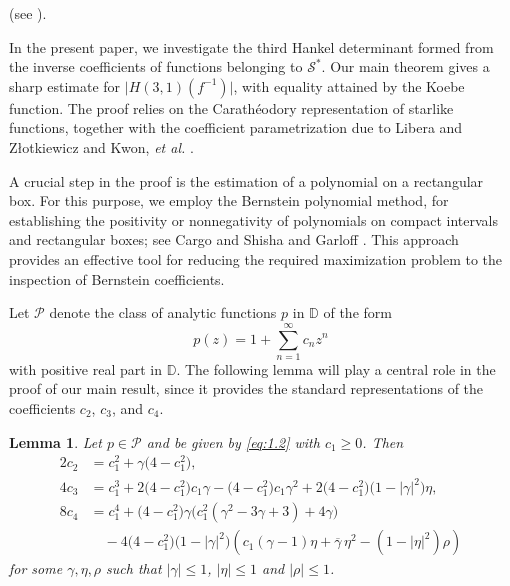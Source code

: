 \documentclass[a4paper,12pt,reqno]{amsart}
\numberwithin{equation}{section}
\newtheorem{lem}[thm]{Lemma}
\begin{document}
(see \cite{KowalczykLeckoSim2018convex,KowalczykLeckoThomas2022}).\\
\par In the present paper, we investigate the third Hankel determinant formed from the inverse coefficients of functions belonging to \(\mathcal{S}^{*}\). Our main theorem gives a sharp estimate for \(\bigl|H(3,1)(f^{-1})\bigr|\), with equality attained by the Koebe function. The proof relies on the Carath\'eodory representation of starlike functions, together with the coefficient parametrization due to Libera and Z{\l}otkiewicz \cite{LiberaZlotkiewicz1982} and Kwon, \textit{et al.} \cite{KwonLeckoSim2018Caratheodory}.\\
\par A crucial step in the proof is the estimation of a polynomial on a rectangular box. For this purpose, we employ the Bernstein polynomial method,  for establishing the positivity or nonnegativity of polynomials on compact intervals and rectangular boxes; see Cargo and Shisha \cite{CargoShisha1966} and Garloff \cite{Garloff1986}. This approach provides an effective tool for reducing the required maximization problem to the inspection of Bernstein coefficients.

Let \(\mathcal{P}\) denote the class of analytic functions \(p\) in \(\mathbb{D}\) of the form
\begin{equation}
	\label{eq:1.2}
	p(z)=1+\sum_{n=1}^{\infty}c_n z^n
\end{equation}
with positive real part in \(\mathbb{D}\). The following lemma will play a central role in the proof of our main result, since it provides the standard representations of the coefficients \(c_2\), \(c_3\), and \(c_4\).
	
\begin{lem}{\cite{LiberaZlotkiewicz1982}}
	\label{lem:1.1}
		Let $p \in \mathcal{P}$ and be given by \eqref{eq:1.2} with $c_1 \ge 0$. Then
		\begin{align*}
			2 c_2 &= c_1^2 + \gamma \bigl(4 - c_1^2\bigr), \\[2mm]
			4 c_3 &= c_1^3 + 2\bigl(4 - c_1^2\bigr)c_1 \gamma
			- \bigl(4 - c_1^2\bigr)c_1 \gamma^2
			+ 2\bigl(4 - c_1^2\bigr)\bigl(1 - |\gamma|^2\bigr)\eta, \\[2mm]
			8 c_4 &= c_1^4
			+ \bigl(4 - c_1^2\bigr)\gamma\bigl(c_1^2(\gamma^2 - 3\gamma + 3) + 4\gamma\bigr)\\[1mm]
			&\quad- 4\bigl(4 - c_1^2\bigr)\bigl(1 - |\gamma|^2\bigr)
			\left(c_1(\gamma - 1)\eta + \overline{\gamma}\,\eta^2
			- (1 - |\eta|^2)\rho\right)
		\end{align*}
		for some $\gamma,\eta,\rho$ such that $|\gamma| \le 1$, $|\eta| \le 1$ and $|\rho| \le 1$.
	\end{lem}
	
\end{document}
